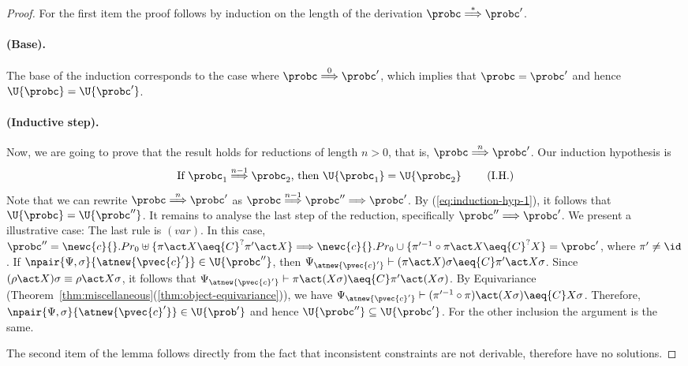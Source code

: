 \begin{proof}
    For the first item the proof follows by induction on the length of the derivation $\probc\overset{*}{\Longrightarrow} \probc'$.

    \paragraph{(Base).} The base of the induction corresponds to the case where $\probc\overset{0}{\Longrightarrow} \probc'$, which implies that $\probc = \probc'$ and hence  $\U{\probc} = \U{\probc'}$.

    \paragraph{(Inductive step).} Now, we are going to prove that the result holds for reductions of length $n>0$, that is, $\probc\overset{n}{\Longrightarrow} \probc'$. Our induction hypothesis is
           \begin{equation}\label{eq:induction-hyp-1}
                \text{If ${\probc}_1\overset{n-1}{\Longrightarrow} {\probc}_2$, then $\U{{\probc}_1}=\U{{\probc}_2}$ }\tag{I.H.}
            \end{equation}
            Note that we can rewrite  $\probc\overset{n}{\Longrightarrow} \probc'$ as  $\probc\overset{n-1}{\Longrightarrow} \probc''\Longrightarrow \probc'$. By (\ref{eq:induction-hyp-1}), it follows that $\U{\probc} = \U{\probc''}$. It remains to analyse the last step of the reduction, specifically $\probc''\Longrightarrow \probc'$. We present a illustrative case: The last rule is $(var)$. In this case, $\probc'' = \newc{c}{}.Pr_0\uplus\{\pi\act X \aeq{C}^? \pi'\act X\} \Longrightarrow \newc{c}{}.Pr_0 \cup\{\pi'^{-1}\circ\pi\act X\aeq{C}^? X\} = \probc'$, where $\pi'\neq \id$. If $\npair{\Psi,\sigma}{\atnew{\pvec{c}'}}\in\U{\probc''}$, then
                $\Psi_{\atnew{\pvec{c}'}} \vdash (\pi\act X)\sigma \aeq{C} \pi'\act X\sigma$. Since $(\rho\act X)\sigma \equiv \rho\act X\sigma$, it follows that $\Psi_{\atnew{\pvec{c}'}} \vdash \pi\act (X\sigma) \aeq{C} \pi'\act (X\sigma)$. By Equivariance (Theorem~\ref{thm:miscellaneous}(\ref{thm:object-equivariance})), we have $\Psi_{\atnew{\pvec{c}'}} \vdash (\pi'^{-1}\circ\pi)\act (X\sigma) \aeq{C} X\sigma$. Therefore, $\npair{\Psi,\sigma}{\atnew{\pvec{c}'}}\in\U{\prob'}$ and hence $\U{\probc''} \subseteq \U{\probc'}$. For the other inclusion the argument is the same.

                
        The second item of the lemma follows directly from the fact that inconsistent constraints are not derivable, therefore have no solutions.
 \end{proof}

